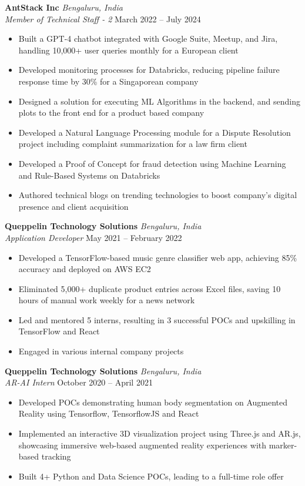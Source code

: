 \documentclass[10pt,a4paper]{article}
\begin{document}
\vspace{0.3em}
\noindent\textbf{AntStack Inc} \hfill \textit{Bengaluru, India}\\
\textit{Member of Technical Staff - 2} \hfill March 2022 – July 2024
\begin{itemize}
    \item Built a GPT-4 chatbot integrated with Google Suite, Meetup, and Jira, handling 10,000+ user queries monthly for a European client
    \item Developed monitoring processes for Databricks, reducing pipeline failure response time by 30\% for a Singaporean company
    \item Designed a solution for executing ML Algorithms in the backend, and sending plots to the front end for a product based company
    \item Developed a Natural Language Processing module for a Dispute Resolution project including complaint summarization for a law firm client
    \item Developed a Proof of Concept for fraud detection using Machine Learning and Rule-Based Systems on Databricks
    \item Authored technical blogs on trending technologies to boost company's digital presence and client acquisition
\end{itemize}

\vspace{0.3em}
\noindent\textbf{Queppelin Technology Solutions} \hfill \textit{Bengaluru, India}\\
\textit{Application Developer} \hfill May 2021 – February 2022
\begin{itemize}
    \item Developed a TensorFlow-based music genre classifier web app, achieving 85\% accuracy and deployed on AWS EC2
    \item Eliminated 5,000+ duplicate product entries across Excel files, saving 10 hours of manual work weekly for a news network
    \item Led and mentored 5 interns, resulting in 3 successful POCs and upskilling in TensorFlow and React
    \item Engaged in various internal company projects
\end{itemize}

\vspace{0.3em}
\noindent\textbf{Queppelin Technology Solutions} \hfill \textit{Bengaluru, India}\\
\textit{AR-AI Intern} \hfill October 2020 – April 2021
\begin{itemize}
    \item Developed POCs demonstrating human body segmentation on Augmented Reality using Tensorflow, TensorflowJS and React
    \item Implemented an interactive 3D visualization project using Three.js and AR.js, showcasing immersive web-based augmented reality experiences with marker-based tracking
    \item Built 4+ Python and Data Science POCs, leading to a full-time role offer
\end{itemize}
\end{document}
